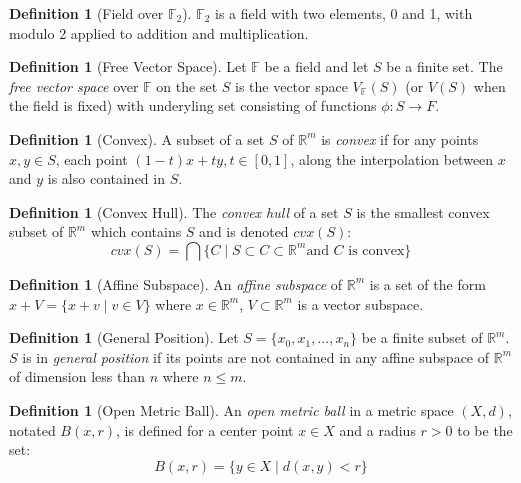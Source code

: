 \documentclass[ma]{uncgdissertationexp}
\theoremstyle{plain}
\theoremstyle{definition}
\newtheorem{definition}[theorem]{Definition}
\theoremstyle{remark}
\begin{document}
\begin{definition}[Field over $\mathbb{F}_{2}$]
\par $\mathbb{F}_{2}$ is a field with two elements, 0 and 1, with modulo 2 applied to addition and multiplication.
\end{definition}

\begin{definition}[Free Vector Space]
\par Let $\mathbb{F}$ be a field and let $S$ be a finite set. The \textit{free vector space} over $\mathbb{F}$ on the set $S$ is the vector space $V_{\mathbb{F}}(S)$ (or $V(S)$ when the field is fixed) with underyling set consisting of functions $\phi: S \rightarrow F$.
\end{definition}

\begin{definition}[Convex]
\par A subset of a set $S$ of $\mathbb{R}^m$ is \textit{convex} if for any points $x, y \in S$, each point $(1-t)x+ty, t\in [0,1]$, along the interpolation between $x$ and $y$ is also contained in $S$.
\end{definition}

\begin{definition}[Convex Hull]
\par The \textit{convex hull} of a set $S$ is the smallest convex subset of $\mathbb{R}^m$ which contains $S$ and is denoted $cvx(S)$:
$$cvx(S) = \bigcap\{C \mid S\subset C \subset \mathbb{R}^m \text{and } C \text{ is convex}\}$$
\end{definition}

\begin{definition}[Affine Subspace]
\par An \textit{affine subspace} of $\mathbb{R}^m$ is a set of the form
$x+V = \{x + v \mid v\in V\}$ where $x\in\mathbb{R}^m$, $V\subset\mathbb{R}^m$ is a vector subspace.
\end{definition}

\begin{definition}[General Position]
Let $S=\{x_0, x_1, ..., x_n\}$ be a finite subset of $\mathbb{R}^m$. $S$ is in \textit{general position} if its points are not contained in any affine subspace of $\mathbb{R}^m$ of dimension less than $n$ where $n\leq m$.
\end{definition}

\begin{definition}[Open Metric Ball]
\par An \textit{open metric ball} in a metric space $(X, d)$, notated $B(x, r)$, is defined for a center point $x\in X$ and a radius $r>0$ to be the set:
$$B(x,r) = \{y\in X \mid d(x,y)<r\}$$
\end{definition}
\end{document}
